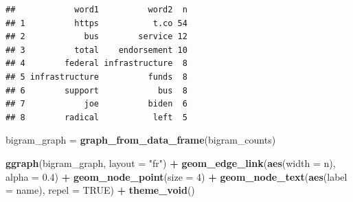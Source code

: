 \documentclass[
]{article}
\newenvironment{Shaded}{\begin{snugshade}}{\end{snugshade}}
\newcommand{\AttributeTok}[1]{\textcolor[rgb]{0.13,0.29,0.53}{#1}}
\newcommand{\ConstantTok}[1]{\textcolor[rgb]{0.56,0.35,0.01}{#1}}
\newcommand{\DecValTok}[1]{\textcolor[rgb]{0.00,0.00,0.81}{#1}}
\newcommand{\FloatTok}[1]{\textcolor[rgb]{0.00,0.00,0.81}{#1}}
\newcommand{\FunctionTok}[1]{\textcolor[rgb]{0.13,0.29,0.53}{\textbf{#1}}}
\newcommand{\NormalTok}[1]{#1}
\newcommand{\OtherTok}[1]{\textcolor[rgb]{0.56,0.35,0.01}{#1}}
\newcommand{\SpecialCharTok}[1]{\textcolor[rgb]{0.81,0.36,0.00}{\textbf{#1}}}
\newcommand{\StringTok}[1]{\textcolor[rgb]{0.31,0.60,0.02}{#1}}
\begin{document}
\begin{Shaded}
\end{Shaded}

\begin{verbatim}
##            word1          word2  n
## 1          https           t.co 54
## 2            bus        service 12
## 3          total    endorsement 10
## 4        federal infrastructure  8
## 5 infrastructure          funds  8
## 6        support            bus  8
## 7            joe          biden  6
## 8        radical           left  5
\end{verbatim}

\begin{Shaded}
\begin{Highlighting}[]
\NormalTok{bigram\_graph }\OtherTok{=} \FunctionTok{graph\_from\_data\_frame}\NormalTok{(bigram\_counts)}

\FunctionTok{ggraph}\NormalTok{(bigram\_graph, }\AttributeTok{layout =} \StringTok{"fr"}\NormalTok{) }\SpecialCharTok{+}
  \FunctionTok{geom\_edge\_link}\NormalTok{(}\FunctionTok{aes}\NormalTok{(}\AttributeTok{width =}\NormalTok{ n), }\AttributeTok{alpha =} \FloatTok{0.4}\NormalTok{) }\SpecialCharTok{+}
  \FunctionTok{geom\_node\_point}\NormalTok{(}\AttributeTok{size =} \DecValTok{4}\NormalTok{) }\SpecialCharTok{+}
  \FunctionTok{geom\_node\_text}\NormalTok{(}\FunctionTok{aes}\NormalTok{(}\AttributeTok{label =}\NormalTok{ name), }\AttributeTok{repel =} \ConstantTok{TRUE}\NormalTok{) }\SpecialCharTok{+}
  \FunctionTok{theme\_void}\NormalTok{()}
\end{Highlighting}
\end{Shaded}
\end{document}
